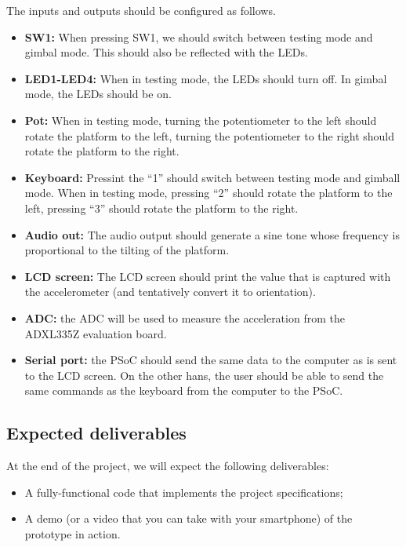 The inputs and outputs should be configured as follows. 
\begin{itemize}
	\item \textbf{SW1: } When pressing SW1, we should switch between testing mode and gimbal mode. This should also be reflected with the LEDs. 
	\item \textbf{LED1-LED4: }When in testing mode, the LEDs should turn off. In gimbal mode, the LEDs should be on. 
	\item \textbf{Pot: }When in testing mode, turning the potentiometer to the left should rotate the platform to the left, turning the potentiometer to the right should rotate the platform to the right. 
	\item \textbf{Keyboard: }Pressint the ``1'' should switch between testing mode and gimball mode. When in testing mode, pressing ``2'' should rotate the platform to the left, pressing ``3'' should rotate the platform to the right. 
	\item \textbf{Audio out: } The audio output should generate a sine tone whose frequency is proportional to the tilting of the platform. 
	\item \textbf{LCD screen: } The LCD screen should print the value that is captured with the accelerometer (and tentatively convert it to orientation). 
	\item \textbf{ADC: } the ADC will be used to measure the acceleration from the ADXL335Z evaluation board. 
	\item \textbf{Serial port: } the PSoC should send the same data to the computer as is sent to the LCD screen. On the other hans, the user should be able to send the same commands as the keyboard from the computer to the PSoC.  
\end{itemize}




\subsection{Expected deliverables}

At the end of the project, we will expect the following deliverables: 
\begin{itemize}
	\item A fully-functional code that implements the project specifications; 
	\item A demo (or a video that you can take with your smartphone) of the prototype in action. 
\end{itemize}




